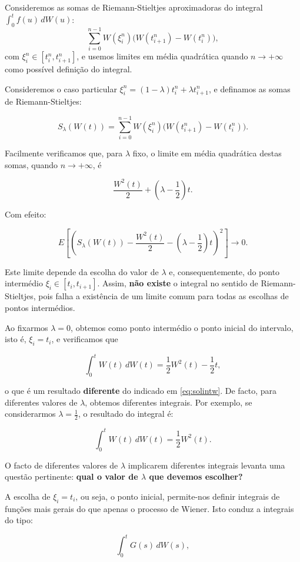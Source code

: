 \documentclass[
  11pt,
  a4paper,
]{book}
\theoremstyle{definition}
\theoremstyle{definition}
\theoremstyle{definition}
\theoremstyle{definition}
\theoremstyle{remark}
\begin{document}
Consideremos as somas de Riemann-Stieltjes aproximadoras do integral \(\int_{0}^{t} f(u)\,dW(u)\):
\[
\sum_{i=0}^{n-1} W(\xi_i^n)\big(W(t_{i+1}^n) - W(t_i^n)\big),
\]
com \(\xi_i^n \in [t_i^n, t_{i+1}^n]\), e usemos limites em média quadrática quando \(n \to +\infty\) como possível definição do integral.

Consideremos o caso particular \(\xi_i^n = (1 - \lambda)t_i^n + \lambda t_{i+1}^n\), e definamos as somas de Riemann-Stieltjes:

\[
S_{\lambda}(W(t)) = \sum_{i=0}^{n-1} W(\xi_i^n)\big(W(t_{i+1}^n) - W(t_i^n)\big).
\]

Facilmente verificamos que, para \(\lambda\) fixo, o limite em média quadrática destas somas, quando \(n \to +\infty\), é

\[
\frac{W^2(t)}{2} + \left(\lambda - \frac{1}{2}\right)t.
\]

Com efeito:

\[
E\left[\left(S_{\lambda}(W(t)) - \frac{W^2(t)}{2} - \left(\lambda - \frac{1}{2}\right)t\right)^2\right] \longrightarrow 0.
\]

Este limite depende da escolha do valor de \(\lambda\) e, consequentemente, do ponto intermédio \(\xi_i \in [t_i, t_{i+1}]\). Assim, \textbf{não existe} o integral no sentido de Riemann-Stieltjes, pois falha a existência de um limite comum para todas as escolhas de pontos intermédios.

Ao fixarmos \(\lambda = 0\), obtemos como ponto intermédio o ponto inicial do intervalo, isto é, \(\xi_i = t_i\), e verificamos que

\[
\int_{0}^{t} W(t)\,dW(t) = \frac{1}{2}W^2(t) - \frac{1}{2}t,
\]

o que é um resultado \textbf{diferente} do indicado em \eqref{eq:solintw}. De facto, para diferentes valores de \(\lambda\), obtemos diferentes integrais. Por exemplo, se considerarmos \(\lambda = \frac{1}{2}\), o resultado do integral é:

\[
\int_{0}^{t} W(t)\,dW(t) = \frac{1}{2}W^2(t).
\]

O facto de diferentes valores de \(\lambda\) implicarem diferentes integrais levanta uma questão pertinente: \textbf{qual o valor de \(\lambda\) que devemos escolher?}

A escolha de \(\xi_i = t_i\), ou seja, o ponto inicial, permite-nos definir integrais de funções mais gerais do que apenas o processo de Wiener. Isto conduz a integrais do tipo:

\[
\int_{0}^{t} G(s)\,dW(s),
\]
\end{document}
